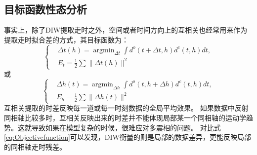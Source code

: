\subsection{目标函数性态分析}
事实上，除了DIW提取走时之外，空间或者时间方向上的互相关也经常用来作为提取走时拟合差的方式\cite{vanLeeuwen:2010,chi2015,Wang2015}，其目标函数为：
\begin{equation}
\left\{
	\begin{aligned}
		&\Delta t(h)=\mathop{\arg\min}_{\Delta t}\int d^{o}(t+\Delta t,h)d^{c}(t,h)dt,\\
	&E_t=\frac{1}{2}\sum\parallel \Delta t(h)\parallel ^2
	\end{aligned}
	\right.
    \label{eq:Obj_TimeCorr} 
\end{equation}
或
\begin{equation}
\left\{
	\begin{aligned}
		&\Delta h(t)=\mathop{\arg\min}_{\Delta h}\int d^{o}(t,h+\Delta h)d^{c}(t,h)dt,\\
	&E_h=\frac{1}{2}\sum\parallel \Delta h(t)\parallel ^2
	\end{aligned}
	\right.
    \label{eq:Obj_SpatialCorr} 
\end{equation}
互相关提取的时差反映每一道或每一时刻数据的全局平均效果。
如果数据中反射同相轴比较多时，互相关反映出来的时差并不能体现局部某一个同相轴的运动学趋势。这就导致如果在模型复杂的时候，很难应对多震相的问题。
对比式\eqref{eq:Objectivefunction}可以发现，DIW衡量的则是局部的数据差异，更能反映局部的同相轴走时残差。

